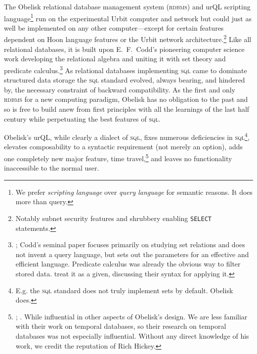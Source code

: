 \documentclass[twoside]{article}
\begin{document}
The Obelisk relational database management system (\textsc{rdbms}) and urQL scripting language\footnote{We prefer \emph{scripting language} over \emph{query language} for semantic reasons. It does more than query.} run on the experimental Urbit computer and network but could just as well be implemented on any other computer---except for \mbox{certain} features dependent on Hoon language features or the Urbit network architecture.\footnote{Notably subnet security features and shrubbery enabling \lstinline[style=inlinecode]{SELECT} statements.} Like all relational databases, it is built upon E.\ F.\ Codd's pioneering computer science work developing the relational algebra and uniting it with set theory and predicate calculus.\footnote{\citet{Codd1970}; \citet{Chamberlin1974} Codd's seminal paper focuses primarily on studying set relations and does not invent a query language, but sets out the parameters for an effective and efficient language. Predicate calculus was already the obvious way to filter stored data. \citet{Chamberlin1974} treat it as a given, discussing their syntax for applying it.} As relational databases implementing \textsc{sql} came to dominate structured data storage the \textsc{sql} standard evolved, always bearing, and hindered by, the necessary constraint of backward compatibility. As the first and only \textsc{rdbms} for a new computing paradigm, Obelisk has no obligation to the past and so is free to build anew from first principles with all the learnings of the last half century while perpetuating the best features of \textsc{sql}.

Obelisk's urQL, while clearly a dialect of \textsc{sql}, fixes numerous deficiencies in \textsc{sql}\footnote{E.g. the \textsc{sql} standard does not truly implement sets by default. Obelisk does.}, elevates composability to a syntactic requirement (not merely an option), adds one completely new major feature, time travel,\footnote{\citet{DarwenDate1998}; \citet{DarwenDate2002}. While influential in other aspects of Obelisk's design. We are less familiar with their work on temporal databases, so their research on temporal databases was not especially influential. Without any direct knowledge of his work, we credit the reputation of Rich Hickey.} and leaves no functionality inaccessible to the normal user.
\end{document}
